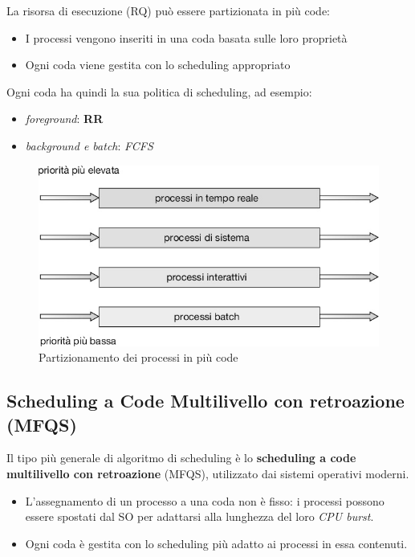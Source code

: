 La risorsa di esecuzione (RQ) può essere partizionata in più code:
\begin{itemize}
    \item I processi vengono inseriti in una coda basata sulle loro proprietà
    \item Ogni coda viene gestita con lo scheduling appropriato
\end{itemize}
Ogni coda ha quindi la sua politica di scheduling, ad esempio:
\begin{itemize}
    \item \textit{foreground}: \textbf{RR}
    \item  \textit{background e batch}: \textit{FCFS}
\end{itemize}

\begin{figure}[h]
    \centering
    \includegraphics[width=0.5\linewidth]{images/Scheduling_multiple_queue.png}
    \caption{Partizionamento dei processi in più code}
\end{figure}

\subsection{Scheduling a Code Multilivello con retroazione (MFQS)}
Il tipo più generale di algoritmo di scheduling è lo \textbf{scheduling a code multilivello con retroazione} (MFQS), utilizzato dai sistemi operativi moderni.

\begin{itemize}
    \item L'assegnamento di un processo a una coda non è fisso: i processi possono essere spostati dal SO per adattarsi alla lunghezza del loro \textit{CPU burst}.
    \item Ogni coda è gestita con lo scheduling più adatto ai processi in essa contenuti.
\end{itemize}

